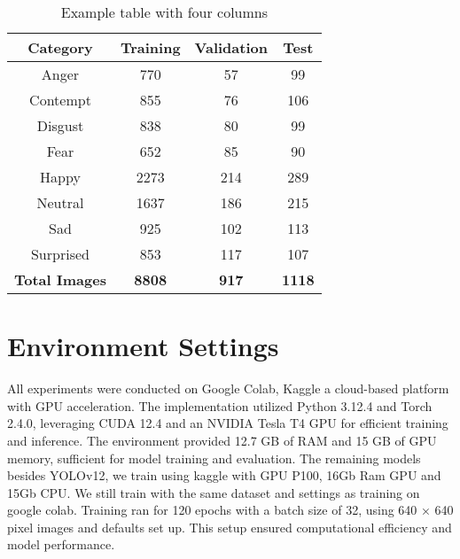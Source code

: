 \documentclass[a4paper,13pt]{report}
\begin{document}
\begin{table}[H]
    \centering
    \caption{Example table with four columns}
    \label{tab:example_table}
    \begin{tabular}{cccc}
        \toprule
        \textbf{Category} & \textbf{Training} & \textbf{Validation} & \textbf{Test} \\
        \midrule
            Anger & 770 & 57 & 99 \\
            Contempt & 855 & 76 & 106 \\
            Disgust & 838 & 80 & 99 \\
            Fear & 652 & 85 & 90 \\
            Happy & 2273 & 214 & 289 \\
            Neutral & 1637 & 186 & 215 \\
            Sad & 925 & 102 & 113 \\
            Surprised & 853 & 117 & 107 \\
        \bottomrule
        \textbf{Total Images} & \textbf{8808} & \textbf{917} & \textbf{1118} \\
    \end{tabular}
\end{table}

\section{Environment Settings}
All experiments were conducted on Google Colab, Kaggle a cloud-based platform with GPU acceleration. The implementation utilized Python 3.12.4 and Torch 2.4.0, leveraging CUDA 12.4 and an NVIDIA Tesla T4 GPU for efficient training and inference. The environment provided 12.7 GB of RAM and 15 GB of GPU memory, sufficient for model training and evaluation. The remaining models besides YOLOv12, we train using kaggle with GPU P100, 16Gb Ram GPU and 15Gb CPU. We still train with the same dataset and settings as training on google colab. Training ran for 120 epochs with a batch size of 32, using 640 × 640 pixel images and defaults set up. This setup ensured computational efficiency and model performance.
\end{document}
